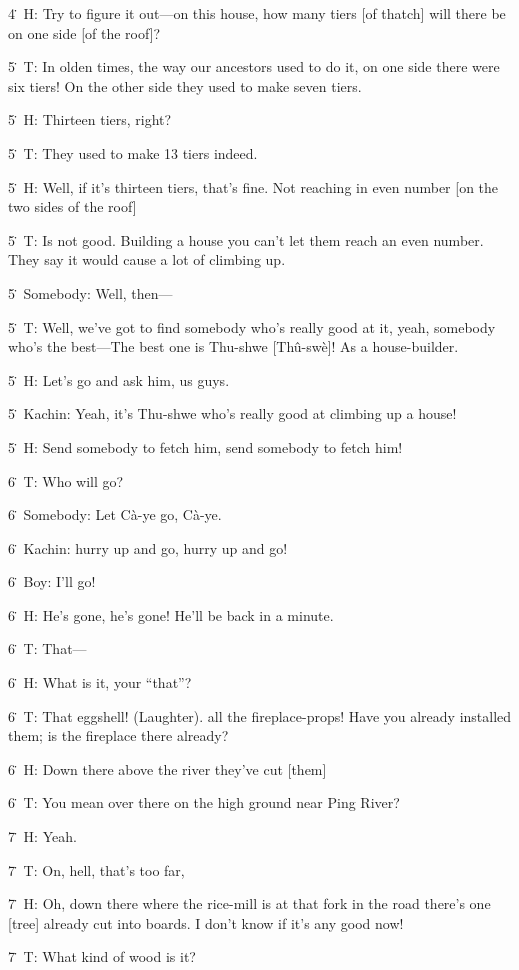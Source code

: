 4\. H: Try to figure it out---on this house, how many tiers [of thatch] will there
be on one side [of the roof]?

5\. T: In olden times, the way our ancestors used to do it, on one side there were
six tiers!  On the other side they used to make seven tiers.

5\. H: Thirteen tiers, right?

5\. T: They used to make 13 tiers indeed.

5\. H: Well, if it's thirteen tiers, that's fine.  Not reaching in even number
[on the two sides of the roof]

5\. T: Is not good.  Building a house you can't let them reach an even number.
They say it would cause a lot of climbing up.

5\. Somebody: Well, then---

5\. T: Well, we've got to find somebody who's really good at it, yeah, somebody
who's the best---The best one is Thu-shwe [Thû-swè]!  As a house-builder.

5\. H: Let's go and ask him, us guys.

5\. Kachin: Yeah, it's Thu-shwe who's really good at climbing up a house!

5\. H: Send somebody to fetch him, send somebody to fetch him!

6\. T: Who will go?

6\. Somebody: Let Cà-ye go, Cà-ye.

6\. Kachin: hurry up and go, hurry up and go!

6\. Boy: I'll go!

6\. H: He's gone, he's gone!  He'll be back in a minute.

6\. T: That---

6\. H: What is it, your ``that''?

6\. T: That eggshell! (Laughter). all the fireplace-props!  Have you already installed
them; is the fireplace there already?

6\. H: Down there above the river they've cut [them]

6\. T: You mean over there on the high ground near Ping River?

7\. H: Yeah.

7\. T: On, hell, that's too far,

7\. H: Oh, down there where the rice-mill is at that fork in the road there's one
[tree] already cut into boards.  I don't know if it's any good now!

7\. T: What kind of wood is it?

